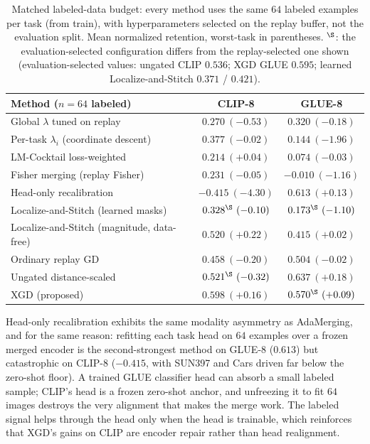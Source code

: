 \documentclass{article} %
\begin{document}
\begin{table}[t]
\centering
\small
\caption{Matched labeled-data budget: every method uses the same $64$ labeled examples per task (from train), with hyperparameters selected on the replay buffer, not the evaluation split. Mean normalized retention, worst-task in parentheses. $^\S$: the evaluation-selected configuration differs from the replay-selected one shown (evaluation-selected values: ungated CLIP $0.536$; XGD GLUE $0.595$; learned Localize-and-Stitch $0.371$ / $0.421$).}
\label{tab:matched}
\begin{tabular}{lcc}
\toprule
Method ($n=64$ labeled) & CLIP-8 & GLUE-8 \\
\midrule
Global $\lambda$ tuned on replay          & $0.270\ (-0.53)$ & $0.320\ (-0.18)$ \\
Per-task $\lambda_i$ (coordinate descent) & $0.377\ (-0.02)$ & $0.144\ (-1.96)$ \\
LM-Cocktail loss-weighted                 & $0.214\ (+0.04)$ & $0.074\ (-0.03)$ \\
Fisher merging (replay Fisher)            & $0.231\ (-0.05)$ & $-0.010\ (-1.16)$ \\
Head-only recalibration                   & $-0.415\ (-4.30)$ & $0.613\ (+0.13)$ \\
Localize-and-Stitch (learned masks)       & $0.328^\S\ (-0.10)$ & $0.173^\S\ (-1.10)$ \\
Localize-and-Stitch (magnitude, data-free)& $0.520\ (+0.22)$ & $0.415\ (+0.02)$ \\
Ordinary replay GD                        & $0.458\ (-0.20)$ & $0.504\ (-0.02)$ \\
Ungated distance-scaled                   & $0.521^\S\ (-0.32)$ & $\mathbf{0.637}\ (+0.18)$ \\
XGD (proposed)                            & $\mathbf{0.598}\ (+\mathbf{0.16})$ & $0.570^\S\ (+0.09)$ \\
\bottomrule
\end{tabular}
\end{table}

Head-only recalibration exhibits the same modality asymmetry as AdaMerging, and for the same reason: refitting each task head on $64$ examples over a frozen merged encoder is the second-strongest method on GLUE-8 ($0.613$) but catastrophic on CLIP-8 ($-0.415$, with SUN397 and Cars driven far below the zero-shot floor). A trained GLUE classifier head can absorb a small labeled sample; CLIP's head is a frozen zero-shot anchor, and unfreezing it to fit $64$ images destroys the very alignment that makes the merge work. The labeled signal helps through the head only when the head is trainable, which reinforces that XGD's gains on CLIP are encoder repair rather than head realignment.
\end{document}
